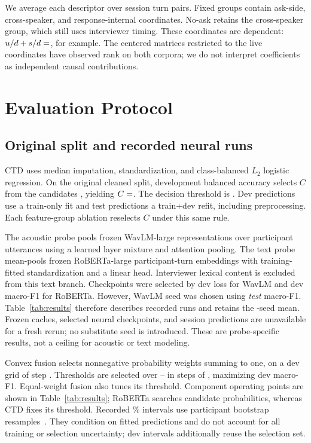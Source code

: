\documentclass{article}
\begin{document}
We average each descriptor over session turn pairs. Fixed groups contain  ask-side,  cross-speaker, and  response-internal coordinates. No-ask retains the cross-speaker group, which still uses interviewer timing. These coordinates are dependent: $u/d+s/d=\R{unitSum}$, for example. The centered matrices restricted to the  live coordinates have observed rank  on both corpora; we do not interpret coefficients as independent causal contributions.

\section{Evaluation Protocol}
\subsection{Original split and recorded neural runs}
CTD uses median imputation, standardization, and class-balanced $L_2$ logistic regression. On the original cleaned split, development balanced accuracy selects $C$ from the candidates , yielding $C=\R{fitC}$. The decision threshold is . Dev predictions use a train-only fit and test predictions a train+dev refit, including preprocessing. Each feature-group ablation reselects $C$ under this same rule.

The acoustic probe pools frozen WavLM-large representations over participant utterances using a learned layer mixture and attention pooling. The text probe mean-pools frozen RoBERTa-large participant-turn embeddings with training-fitted standardization and a linear head. Interviewer lexical content is excluded from this text branch. Checkpoints were selected by dev loss for WavLM and dev macro-F1 for RoBERTa. However, WavLM seed  was chosen using \emph{test} macro-F1. Table~\ref{tab:results} therefore describes recorded runs and retains the -seed mean. Frozen caches, selected neural checkpoints, and session predictions are unavailable for a fresh rerun; no substitute seed is introduced. These are probe-specific results, not a ceiling for acoustic or text modeling.

Convex fusion selects nonnegative probability weights summing to one, on a dev grid of step . Thresholds are selected over -- in steps of , maximizing dev macro-F1. Equal-weight fusion also tunes its threshold. Component operating points are shown in Table~\ref{tab:results}; RoBERTa searches candidate probabilities, whereas CTD fixes its threshold. Recorded \% intervals use  participant bootstrap resamples~\cite{ferrer2024confidence}. They condition on fitted predictions and do not account for all training or selection uncertainty; dev intervals additionally reuse the selection set.
\end{document}
